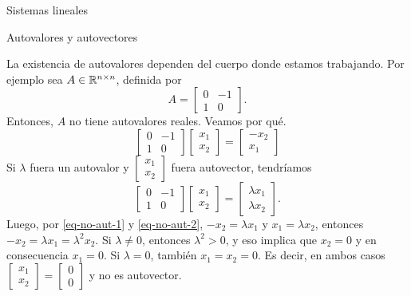 \begin{chapter}{Sistemas lineales}
\begin{section}{Autovalores y autovectores}
        \begin{observacion*}
        La existencia de autovalores dependen del cuerpo donde estamos trabajando. 
        Por ejemplo sea $A \in \mathbb R^{n\times n}$,  definida por 
        $$A=
        \begin{bmatrix}
            0&-1\\1&0
        \end{bmatrix}
        .$$ 
        Entonces,  $A$ no tiene autovalores reales. Veamos por qué.
        \begin{equation}\label{eq-no-aut-1}
            \begin{bmatrix}
                0&-1\\1&0
            \end{bmatrix}
            \begin{bmatrix}
                x_1\\x_2
            \end{bmatrix} =
            \begin{bmatrix}
                -x_2\\x_1
            \end{bmatrix}
        \end{equation}
        Si $\lambda$ fuera un autovalor y $\begin{bmatrix}x_1\\x_2\end{bmatrix}$ fuera autovector, tendríamos
        \begin{equation}\label{eq-no-aut-2}
            \begin{bmatrix}
                0&-1\\1&0
            \end{bmatrix}
            \begin{bmatrix}
                x_1\\x_2
            \end{bmatrix} =
            \begin{bmatrix}
                \lambda x_1\\\lambda x_2
            \end{bmatrix}.
        \end{equation}
        Luego, por \eqref{eq-no-aut-1} y \eqref{eq-no-aut-2}, $-x_2 = \lambda x_1$ y $x_1 = \lambda x_2$,  entonces   $-x_2 = \lambda x_1 = \lambda^2 x_2$. Si  $\lambda \ne0$,  entonces $\lambda^2 >0$, y eso implica que $x_2=0$ y  en consecuencia $x_1=0$. Si $\lambda=0$, también $x_1=x_2 =0$. Es decir, en ambos casos $\begin{bmatrix}x_1\\x_2\end{bmatrix} = \begin{bmatrix}0\\0\end{bmatrix} $ y no es autovector.


\end{observacion*}
\end{section}
\end{chapter}
